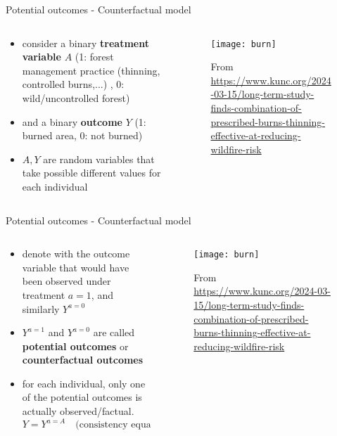 \documentclass{beamer}
\begin{document}
\begin{frame}{Potential outcomes - Counterfactual model}
  \begin{columns}
    \begin{column}{0.5\textwidth}
  \cite{hernan2025causal} \cite{wasserman2013all}  
  \begin{itemize}
    \item consider a binary \textbf{treatment variable} $A$
      (1: forest management practice (thinning, controlled burns,...) , 0: wild/uncontrolled forest)
    \item and a binary \textbf{outcome} $Y$ (1: burned area, 0: not burned)
    \item $A,Y$ are random variables that take possible different values for each individual
  \end{itemize}
  \vfill
    \end{column}
    \begin{column}{0.5\textwidth}
      \begin{figure}
      \texttt{[image: burn]}
	\caption{From \url{https://www.kunc.org/2024-03-15/long-term-study-finds-combination-of-prescribed-burns-thinning-effective-at-reducing-wildfire-risk}} 
      \end{figure}
    \end{column}
  \end{columns}

\end{frame}


\begin{frame}{Potential outcomes - Counterfactual model}
  \begin{columns}
    \begin{column}{0.5\textwidth}
  \cite{hernan2025causal} \cite{wasserman2013all}  
  \begin{itemize}
    \item<1-> denote with the outcome variable that would have been observed under treatment $a=1$, and similarly $Y^{a=0}$
    \item<2-> $Y^{a=1}$ and $Y^{a=0}$ are called \textbf{potential outcomes} or \textbf{counterfactual outcomes}
    \item<3-> for each individual, only one of the potential outcomes
      is actually observed/factual.
      \[ Y = Y^{a=A}  \quad \text{(consistency equation)} \]
  \end{itemize}
    \end{column}
    \begin{column}{0.5\textwidth}
      \begin{figure}
      \texttt{[image: burn]}
	\caption{From \url{https://www.kunc.org/2024-03-15/long-term-study-finds-combination-of-prescribed-burns-thinning-effective-at-reducing-wildfire-risk}} 
      \end{figure}
    \end{column}
  \end{columns}

\end{frame}
\end{document}
